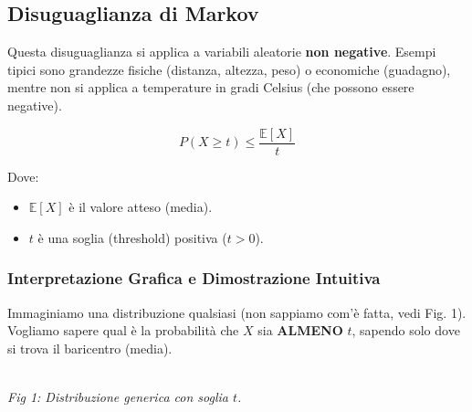 \subsection{Disuguaglianza di Markov}

Questa disuguaglianza si applica a variabili aleatorie \textbf{non negative}. Esempi tipici sono grandezze fisiche (distanza, altezza, peso) o economiche (guadagno), mentre non si applica a temperature in gradi Celsius (che possono essere negative).

\begin{equation}
\boxed{P(X \ge t) \le \frac{\mathbb{E}[X]}{t}}
\end{equation}

Dove:
\begin{itemize}
    \item $\mathbb{E}[X]$ è il valore atteso (media).
    \item $t$ è una soglia (threshold) positiva ($t > 0$).
\end{itemize}

\subsubsection{Interpretazione Grafica e Dimostrazione Intuitiva}

Immaginiamo una distribuzione qualsiasi (non sappiamo com'è fatta, vedi Fig. 1). Vogliamo sapere qual è la probabilità che $X$ sia \textbf{ALMENO} $t$, sapendo solo dove si trova il baricentro (media).

\begin{center}
\\ \textit{Fig 1: Distribuzione generica con soglia $t$.}
\end{center}

